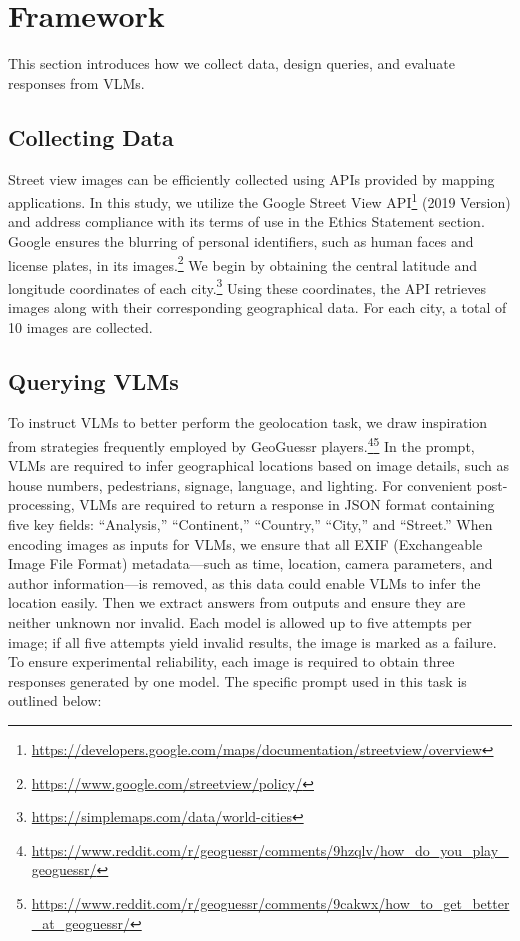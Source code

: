 \section{{\methodname} Framework}

This section introduces how we collect data, design queries, and evaluate responses from VLMs.

\subsection{Collecting Data}

Street view images can be efficiently collected using APIs provided by mapping applications.
In this study, we utilize the Google Street View API\footnote{\url{https://developers.google.com/maps/documentation/streetview/overview}} (2019 Version) and address compliance with its terms of use in the Ethics Statement section. 
Google ensures the blurring of personal identifiers, such as human faces and license plates, in its images.\footnote{\url{https://www.google.com/streetview/policy/}}
We begin by obtaining the central latitude and longitude coordinates of each city.\footnote{\url{https://simplemaps.com/data/world-cities}}
Using these coordinates, the API retrieves images along with their corresponding geographical data.
For each city, a total of 10 images are collected.

\subsection{Querying VLMs}

To instruct VLMs to better perform the geolocation task, we draw inspiration from strategies frequently employed by GeoGuessr players.\footnote{\url{https://www.reddit.com/r/geoguessr/comments/9hzqlv/how_do_you_play_geoguessr/}}\footnote{\url{https://www.reddit.com/r/geoguessr/comments/9cakwx/how_to_get_better_at_geoguessr/}}
In the prompt, VLMs are required to infer geographical locations based on image details, such as house numbers, pedestrians, signage, language, and lighting.
For convenient post-processing, VLMs are required to return a response in JSON format containing five key fields: ``Analysis,'' ``Continent,'' ``Country,'' ``City,'' and ``Street.''
When encoding images as inputs for VLMs, we ensure that all EXIF (Exchangeable Image File Format) metadata—such as time, location, camera parameters, and author information—is removed, as this data could enable VLMs to infer the location easily.
Then we extract answers from outputs and ensure they are neither unknown nor invalid.
Each model is allowed up to five attempts per image; if all five attempts yield invalid results, the image is marked as a failure.
To ensure experimental reliability, each image is required to obtain three responses generated by one model.
The specific prompt used in this task is outlined below:

